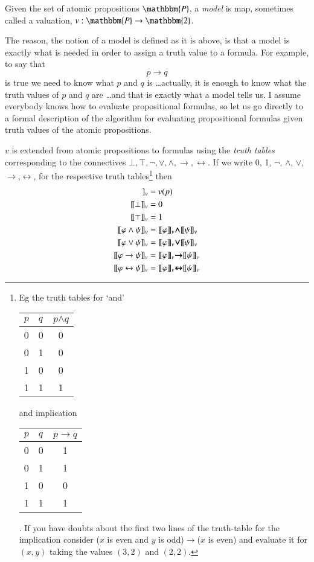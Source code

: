 \documentclass[11pt]{article}
\renewcommand{\phi}{\varphi}
\newcommand{\imp}{\ensuremath{\rightarrow}}
\newcommand{\biimp}{\ensuremath{\leftrightarrow}}
\newcommand{\et}{\ensuremath{\wedge}} %
\newcommand{\ou}{\ensuremath{\vee}} %
\newcommand{\sem}[1]{[\![#1]\!]}
\newcommand{\bbP}{\mathbbm{P}}
\newcounter{prop}
\begin{document}
\begin{definition}
Given the set of atomic propositions  $\bbP$, a \emph{model} is map,
  sometimes called a valuation, $v:\bbP\to\mathbbm{2}$.
\end{definition}

The reason, the notion of a model is defined as it is above, is that a
model is exactly what is needed in order to assign a truth value to a
formula. For example, to say that
\[p\imp q\]
is true we need to know what $p$ and $q$ is \ldots actually, it is enough
to know what the truth values of $p$ and $q$ are \ldots and that is
exactly what a model tells us. I assume everybody knows how to evaluate
propositional formulas, so let us go directly to a formal description
of the algorithm for evaluating propositional formulas given truth
values of the atomic propositions.

\medskip\noindent $v$ is extended from atomic propositions to formulas
using the \emph{truth tables} corresponding to the connectives $\bot,
\top, \neg, \ou, \et, \imp, \biimp$. If we write 0, 1,
\boldmath$\neg$\unboldmath, \boldmath \et\unboldmath, \boldmath
\ou\unboldmath, \boldmath \imp\unboldmath,\boldmath \biimp\unboldmath,
for the respective truth tables\footnote{Eg the truth tables for `and'
  \quad
\begin{tabular}{|l|l|c|} %
\hline
$p$ & $q$ & $p$\boldmath\et\unboldmath$q$\\
\hline
\hline
0&0&0\\
\hline
0&1&0\\
\hline
1&0&0\\
\hline
1&1&1\\
\hline
\end{tabular}
\quad and implication \quad
\begin{tabular}{|l|l|c|}
\hline
$p$ & $q$ & $p$\boldmath\imp\unboldmath$q$\\
\hline
\hline
0&0&1\\
\hline
0&1&1\\
\hline
1&0&0\\
\hline
1&1&1\\
\hline
\end{tabular}. 
If you have doubts about the first two lines of the truth-table for the
implication consider ($x$ is even and $y$ is odd)$\imp$($x$ is even)
and evaluate it for $(x,y)$ taking the values $(3,2)$ and $(2,2)$.
}\label{fn:truth-tables} then
\begin{align*}
\sem{p}_v & = v(p)\\
\sem{\bot}_v & = 0\\
\sem{\top}_v & = 1\\
\sem{\phi\et\psi}_v & = \sem{\phi}_v\mbox{\boldmath
\et\unboldmath}\sem{\psi}_v\\
\sem{\phi\ou\psi}_v & = \sem{\phi}_v\mbox{\boldmath
\ou\unboldmath}\sem{\psi}_v\\
\sem{\phi\imp\psi}_v & = \sem{\phi}_v\mbox{\boldmath
\imp\unboldmath}\sem{\psi}_v\\
\sem{\phi\biimp\psi}_v & = \sem{\phi}_v\mbox{\boldmath
\biimp\unboldmath}\sem{\psi}_v\\
\end{align*}
\end{document}
